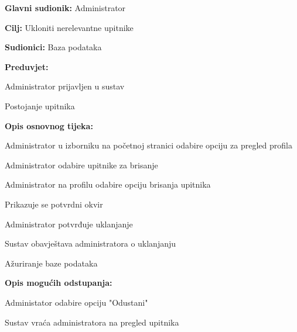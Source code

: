 					\noindent {}
					\begin{packed_item}
	
						\item \textbf{Glavni sudionik:} Administrator
						\item \textbf{Cilj:} Ukloniti nerelevantne upitnike
						\item \textbf{Sudionici:} Baza podataka
						\item \textbf{Preduvjet:} 
						\begin{packed_item}
							\item Administrator prijavljen u sustav
							\item Postojanje upitnika
						\end{packed_item}

						\item \textbf{Opis osnovnog tijeka:}
						
						\item[] \begin{packed_enum}
	
							\item Administrator u izborniku na početnoj stranici odabire opciju za pregled profila
							\item Administrator odabire upitnike za brisanje
							\item Administrator na profilu odabire opciju brisanja upitnika
							\item Prikazuje se potvrdni okvir
							\item Administrator potvrđuje uklanjanje
							\item Sustav obavještava administratora o uklanjanju
							\item Ažuriranje baze podataka
						\end{packed_enum}
							
						\item \textbf{Opis mogućih odstupanja:}
					
							\item[] \begin{packed_item}
		
								\item[5.a] Administator odabire opciju "Odustani"
								\item[] \begin{packed_enum}
									
									\item Sustav vraća administratora na pregled upitnika
									
								\end{packed_enum}
							
							\end{packed_item}

					\end{packed_item}

